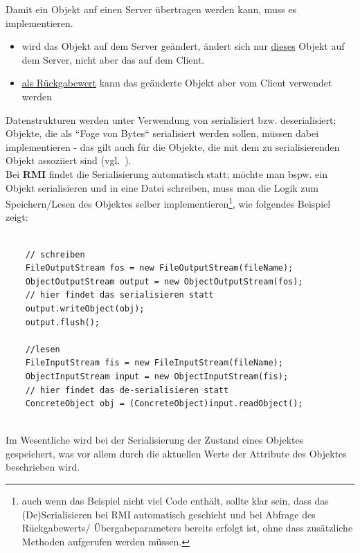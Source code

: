 \begin{tcolorbox}
    Damit ein Objekt auf einen Server übertragen werden kann, muss es  implementieren.
\end{tcolorbox}

\begin{itemize}
    \item wird das Objekt auf dem Server geändert, ändert sich nur \ul{dieses} Objekt auf dem Server, nicht aber das auf dem Client.
    \item \ul{als Rückgabewert} kann das geänderte Objekt aber vom Client verwendet werden
\end{itemize}

Datenstrukturen werden unter Verwendung von  serialisiert {bzw.} deserialisiert; Objekte, die als ``Foge von Bytes`` serialisiert werden sollen, müssen dabei  implementieren  - das gilt auch für die Objekte, die mit dem zu serialisierenden Objekt assoziiert sind (vgl.~\cite[332]{Oec22}).\\

\noindent
Bei \textbf{RMI} findet die Serialisierung automatisch statt; möchte man {bspw.} ein Objekt serialisieren und in eine Datei schreiben, muss man die Logik zum Speichern/Lesen des Objektes selber implementieren\footnote{
auch wenn das Beispiel nicht viel Code enthält, sollte klar sein, dass das (De)Serialisieren bei RMI automatisch geschieht und bei Abfrage des Rückgabewerts/ Übergabeparameters bereits erfolgt ist, ohne dass zusätzliche Methoden aufgerufen werden müssen.
}, wie folgendes Beispiel zeigt:\\

\begin{verbatim}

    // schreiben
    FileOutputStream fos = new FileOutputStream(fileName);
    ObjectOutputStream output = new ObjectOutputStream(fos);
    // hier findet das serialisieren statt
    output.writeObject(obj);
    output.flush();

    //lesen
    FileInputStream fis = new FileInputStream(fileName);
    ObjectInputStream input = new ObjectInputStream(fis);
    // hier findet das de-serialisieren statt
    ConcreteObject obj = (ConcreteObject)input.readObject();
\end{verbatim}\\

\noindent
Im Wesentliche wird bei der Serialisierung der Zustand eines Objektes gespeichert, was vor allem durch die aktuellen Werte der Attribute des Objektes beschrieben wird.\\

